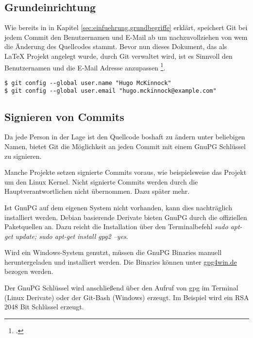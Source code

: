 \subsection{Grundeinrichtung}
\label{sec:einfuehrung.git}
Wie bereits in in Kapitel \ref{sec:einfuehrung.grundbegriffe} erklärt, speichert Git bei jedem Commit den Benutzernamen und E-Mail ab um nachzuvollziehen von wem die Änderung des Quellcodes stammt. Bevor nun dieses Dokument, das als \LaTeX{} Projekt angelegt wurde, durch Git verwaltet wird, ist es Sinnvoll den Benutzernamen und die E-Mail Adresse anzupassen \footcite{git-1.6-your-identity}.

\begin{verbatim}
$ git config --global user.name "Hugo McKinnock"
$ git config --global user.email "hugo.mckinnock@example.com"
\end{verbatim}

\subsection{Signieren von Commits}
\label{sec:einfuehrung.sign-commits}
Da jede Person in der Lage ist den Quellcode boshaft zu ändern unter beliebigen Namen, bietet Git die Möglichkeit an jeden Commit mit einem GnuPG Schlüssel zu signieren.

\begin{info-popup}
  Manche Projekte setzen signierte Commits voraus, wie beispielsweise das Projekt um den Linux Kernel. Nicht signierte Commits werden durch die Hauptverantwortlichen nicht übernommen. Dazu später mehr.
\end{info-popup}

Ist GnuPG auf dem eigenen System nicht vorhanden, kann dies nachträglich installiert werden. Debian basierende Derivate  bieten GnuPG durch die offiziellen Paketquellen an. Dazu reicht die Installation über den Terminalbefehl \textit{sudo apt-get update; sudo apt-get install gpg2 --yes}.

Wird ein Windows-System genutzt, müssen die GnuPG Binaries manuell heruntergeladen und installiert werden. Die Binaries können unter \href{https://www.gpg4win.de}{gpg4win.de} bezogen werden.

Der GnuPG Schlüssel wird anschließend über den Aufruf von gpg im Terminal (Linux Derivate) oder der Git-Bash (Windows) erzeugt. Im Beispiel wird ein RSA 2048 Bit Schlüssel erzeugt.

